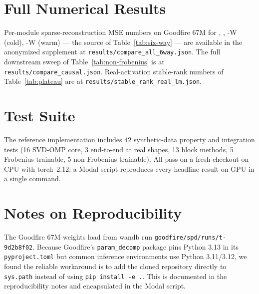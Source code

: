 \section{Full Numerical Results}

Per-module sparse-reconstruction MSE numbers on Goodfire 67M for \svdomp, \vpd, \bsf-W (cold), \bsf-W (warm) --- the source of Table~\ref{tab:six-way} --- are available in the anonymized supplement at \texttt{results/compare\_all\_6way.json}. The full downstream sweep of Table~\ref{tab:non-frobenius} is at \texttt{results/compare\_causal.json}. Real-activation stable-rank numbers of Table~\ref{tab:plateau} are at \texttt{results/stable\_rank\_real\_lm.json}.

\section{Test Suite}

The reference implementation includes 42 synthetic-data property and integration tests (16 SVD-OMP core, 3 end-to-end at real shapes, 13 block methods, 5 Frobenius trainable, 5 non-Frobenius trainable). All pass on a fresh checkout on CPU with torch~2.12; a Modal script reproduces every headline result on GPU in a single command.

\section{Notes on Reproducibility}

The Goodfire 67M weights load from wandb run \texttt{goodfire/spd/runs/t-9d2b8f02}. Because Goodfire's \texttt{param\_decomp} package pins Python 3.13 in its \texttt{pyproject.toml} but common inference environments use Python 3.11/3.12, we found the reliable workaround is to add the cloned repository directly to \texttt{sys.path} instead of using \texttt{pip install -e .}. This is documented in the reproducibility notes and encapsulated in the Modal script.
